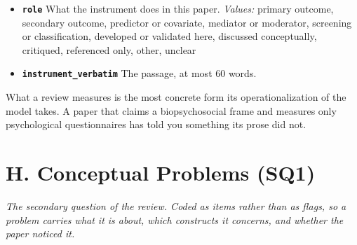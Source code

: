 \documentclass[11pt]{article}
\begin{document}
\begin{description}
\begin{itemize}[leftmargin=1.3em,itemsep=1pt,topsep=2pt]
  \item \textbf{\texttt{role}} What the instrument does in this paper. {\small \textit{Values:} primary outcome, secondary outcome, predictor or covariate, mediator or moderator, screening or classification, developed or validated here, discussed conceptually, critiqued, referenced only, other, unclear}
  \item \textbf{\texttt{instrument\_verbatim}} The passage, at most 60 words.
  \end{itemize}
{\small What a review measures is the most concrete form its operationalization of the model takes. A paper that claims a biopsychosocial frame and measures only psychological questionnaires has told you something its prose did not.}
\end{description}

\section*{H. Conceptual Problems (SQ1)}
{\small\itshape The secondary question of the review. Coded as items rather than as flags, so a problem carries what it is about, which constructs it concerns, and whether the paper noticed it.}\par\smallskip
\end{document}
